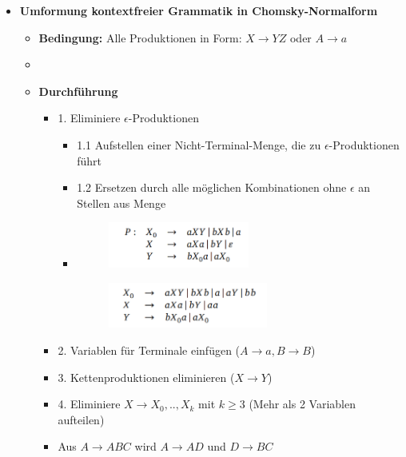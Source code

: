 \documentclass[11pt,a4paper]{article}
\begin{document}
\begin{itemize}
\item {\large \textbf{Umformung kontextfreier Grammatik in Chomsky-Normalform}}
	\begin{itemize}
	\item \textbf{Bedingung:} Alle Produktionen in Form: $X \rightarrow YZ$ oder $A \rightarrow a$
	\item[]
	\item \textbf{Durchführung}
		\begin{itemize}
		\item 1. Eliminiere $\epsilon$-Produktionen	
			\begin{itemize}
			\item 1.1 Aufstellen einer Nicht-Terminal-Menge, die zu $\epsilon$-Produktionen führt
			\item 1.2 Ersetzen durch alle möglichen Kombinationen ohne $\epsilon$ an Stellen aus Menge
			\item[]
				\begin{minipage}{0.4\textwidth}
					\begin{figure}[H]
					\includegraphics[height=1.5cm]{Bilder/epsi1}
					\end{figure}
				\end{minipage}
				\begin{minipage}[t]{0.4\textwidth}
					\vspace{-1cm}
					\begin{figure}[H]
					\includegraphics[height=1.5cm]{Bilder/epsi2}
					\end{figure}
				\end{minipage}
			\end{itemize}
		\item 2. Variablen für Terminale einfügen ($A \rightarrow a, B \rightarrow B$)
		\item 3. Kettenproduktionen eliminieren ($X \rightarrow Y$)
		\item 4. Eliminiere $X \rightarrow X_0,..,X_k$ mit $k \geq 3$ (Mehr als 2 Variablen aufteilen)
		\item Aus $A \rightarrow ABC$ wird $A \rightarrow AD$ und $D \rightarrow BC$
		\end{itemize}
		

\end{itemize}
\end{itemize}
\end{document}
